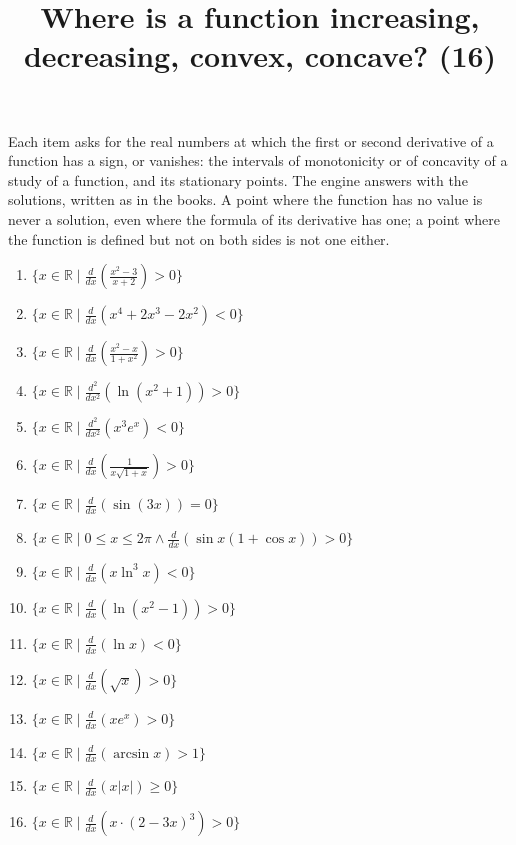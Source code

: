 \documentclass[11pt,a4paper]{article}
\title{Where is a function increasing, decreasing, convex, concave? (16)}
\author{}
\date{}
\begin{document}
\maketitle
Each item asks for the real numbers at which the first or second derivative of a function has a sign, or vanishes: the intervals of monotonicity or of concavity of a study of a function, and its stationary points. The engine answers with the solutions, written as in the books. A point where the function has no value is never a solution, even where the formula of its derivative has one; a point where the function is defined but not on both sides is not one either.

\begin{enumerate}
\item $\displaystyle \{x \in \mathbb{R} \mid \frac{d}{dx}\left( \frac{x^{2} - 3}{x + 2} \right) > 0\}$
\item $\displaystyle \{x \in \mathbb{R} \mid \frac{d}{dx}\left( x^{4} + 2x^{3} - 2x^{2} \right) < 0\}$
\item $\displaystyle \{x \in \mathbb{R} \mid \frac{d}{dx}\left( \frac{x^{2} - x}{1 + x^{2}} \right) > 0\}$
\item $\displaystyle \{x \in \mathbb{R} \mid \frac{d^{2}}{dx^{2}}\left( \ln(x^{2} + 1) \right) > 0\}$
\item $\displaystyle \{x \in \mathbb{R} \mid \frac{d^{2}}{dx^{2}}\left( x^{3}e^{x} \right) < 0\}$
\item $\displaystyle \{x \in \mathbb{R} \mid \frac{d}{dx}\left( \frac{1}{x\sqrt{1 + x}} \right) > 0\}$
\item $\displaystyle \{x \in \mathbb{R} \mid \frac{d}{dx}\left( \sin(3x) \right) = 0\}$
\item $\displaystyle \{x \in \mathbb{R} \mid 0 \le x \le 2\pi \land \frac{d}{dx}\left( \sin x(1 + \cos x) \right) > 0\}$
\item $\displaystyle \{x \in \mathbb{R} \mid \frac{d}{dx}\left( x\ln^{3} x \right) < 0\}$
\item $\displaystyle \{x \in \mathbb{R} \mid \frac{d}{dx}\left( \ln(x^{2} - 1) \right) > 0\}$
\item $\displaystyle \{x \in \mathbb{R} \mid \frac{d}{dx}\left( \ln x \right) < 0\}$
\item $\displaystyle \{x \in \mathbb{R} \mid \frac{d}{dx}\left( \sqrt{x} \right) > 0\}$
\item $\displaystyle \{x \in \mathbb{R} \mid \frac{d}{dx}\left( x e^{x} \right) > 0\}$
\item $\displaystyle \{x \in \mathbb{R} \mid \frac{d}{dx}\left( \arcsin x \right) > 1\}$
\item $\displaystyle \{x \in \mathbb{R} \mid \frac{d}{dx}\left( x|x| \right) \ge 0\}$
\item $\displaystyle \{x \in \mathbb{R} \mid \frac{d}{dx}\left( x \cdot (2 - 3x)^{3} \right) > 0\}$
\end{enumerate}
\end{document}
